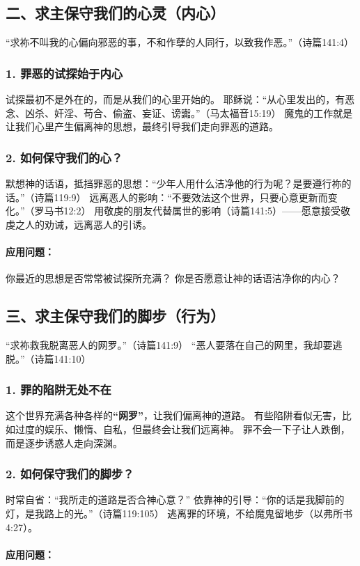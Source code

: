 \documentclass[a4paper, 12pt]{article}
\begin{document}
\subsection*{二、求主保守我们的心灵（内心）}
“求祢不叫我的心偏向邪恶的事，不和作孽的人同行，以致我作恶。”（诗篇141:4）

\subsubsection*{1. 罪恶的试探始于内心}
试探最初不是外在的，而是从我们的心里开始的。
耶稣说：“从心里发出的，有恶念、凶杀、奸淫、苟合、偷盗、妄证、谤讟。”（马太福音15:19）
魔鬼的工作就是让我们心里产生偏离神的思想，最终引导我们走向罪恶的道路。
\subsubsection*{2. 如何保守我们的心？}
默想神的话语，抵挡罪恶的思想：“少年人用什么洁净他的行为呢？是要遵行祢的话。”（诗篇119:9）
远离恶人的影响：“不要效法这个世界，只要心意更新而变化。”（罗马书12:2）
用敬虔的朋友代替属世的影响（诗篇141:5）——愿意接受敬虔之人的劝诫，远离恶人的引诱。
\paragraph*{应用问题：}

你最近的思想是否常常被试探所充满？
你是否愿意让神的话语洁净你的内心？
\subsection*{三、求主保守我们的脚步（行为）}
“求祢救我脱离恶人的网罗。”（诗篇141:9）
“恶人要落在自己的网里，我却要逃脱。”（诗篇141:10）

\subsubsection*{1. 罪的陷阱无处不在}
这个世界充满各种各样的\textbf{“网罗”}，让我们偏离神的道路。
有些陷阱看似无害，比如过度的娱乐、懒惰、自私，但最终会让我们远离神。
罪不会一下子让人跌倒，而是逐步诱惑人走向深渊。
\subsubsection*{2. 如何保守我们的脚步？}
时常自省：“我所走的道路是否合神心意？”
依靠神的引导：“你的话是我脚前的灯，是我路上的光。”（诗篇119:105）
逃离罪的环境，不给魔鬼留地步（以弗所书4:27）。
\paragraph*{应用问题：}
\end{document}
